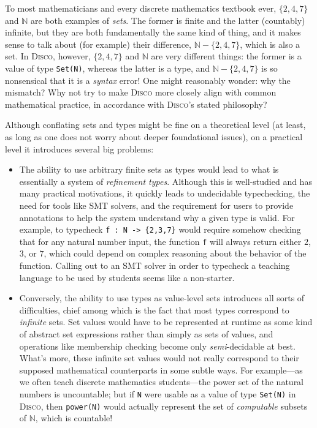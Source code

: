 \documentclass[copyright,creativecommons]{eptcs}
\newcommand{\disco}{\textsc{Disco}\xspace}
\newcommand{\N}{\mathbb{N}}
\begin{document}
To most mathematicians and every discrete mathematics textbook ever,
$\{2,4,7\}$ and $\N$ are both examples of \emph{sets}.  The former is
finite and the latter (countably) infinite, but they are both
fundamentally the same kind of thing, and it makes sense to talk about
(for example) their difference, $\N - \{2,4,7\}$, which is also a set.
In \disco, however, $\{2,4,7\}$ and $\N$ are very different things:
the former is a value of type \texttt{Set(N)}, whereas the
latter is a type, and $\N - \{2,4,7\}$ is so nonsensical that it is a
\emph{syntax} error!  One might reasonably wonder: why the mismatch?
Why not try to make \disco more closely align with common mathematical
practice, in accordance with \disco's stated philosophy?

Although conflating sets and types might be fine on a theoretical
level (at least, as long as one does not worry about deeper
foundational issues), on a practical level it introduces several
big problems:

\begin{itemize}
\item The ability to use arbitrary finite sets as types would lead to
  what is essentially a system of \emph{refinement types}.  Although
  this is well-studied and has many practical motivations, it quickly
  leads to undecidable typechecking, the need for tools like SMT
  solvers, and the requirement for users to provide annotations to
  help the system understand why a given type is valid.  For example,
  to typecheck %
  \verb|f : N -> {2,3,7}| would require somehow checking that for any
  natural number input, the function \verb|f| will always return
  either $2$, $3$, or $7$, which could depend on complex reasoning
  about the behavior of the function.  Calling out to an SMT solver in
  order to typecheck a teaching language to be used by students seems
  like a non-starter.
\item Conversely, the ability to use types as value-level sets
  introduces all sorts of difficulties, chief among which is the fact
  that most types correspond to \emph{infinite} sets.  Set values
  would have to be represented at runtime as some kind of abstract set
  expressions rather than simply as sets of values, and operations
  like membership checking become only \emph{semi}-decidable at best.
  What's more, these infinite set values would not really correspond
  to their supposed mathematical counterparts in some subtle ways.
  For example---as we often teach discrete mathematics students---the
  power set of the natural numbers is uncountable; but if \texttt{N}
  were usable as a value of type \texttt{Set(N)} in \disco, then
  \texttt{power(N)} would actually represent the set of
  \emph{computable} subsets of $\N$, which is countable!
\end{itemize}
\end{document}
